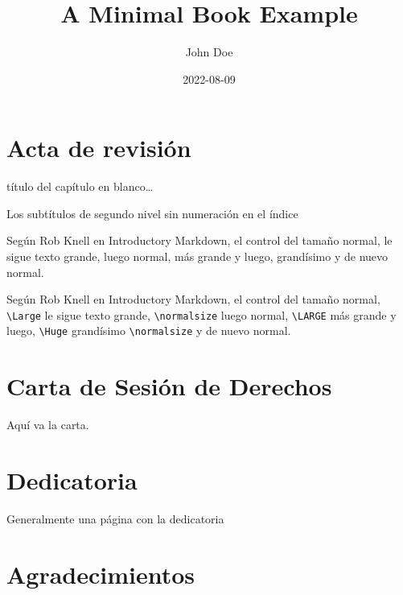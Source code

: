 \documentclass[
  11pt,
  twoside]{book}
\title{A Minimal Book Example}
\author{John Doe}
\date{2022-08-09}
\theoremstyle{definition}
\theoremstyle{definition}
\theoremstyle{definition}
\theoremstyle{definition}
\theoremstyle{remark}
\begin{document}
\maketitle

\fancyfoot[LE,RO]{\thepage}

\hypertarget{acta-de-revisiuxf3n}{%
\chapter*{Acta de revisión}\label{acta-de-revisiuxf3n}}

título del capítulo en blanco\ldots{}

Los subtítulos de segundo nivel sin numeración en el índice

Según Rob Knell en Introductory Markdown, el control del tamaño normal, \Large le sigue texto grande, \normalsize luego normal, \LARGE más grande y luego, \Huge grandísimo \normalsize y de nuevo normal.

Según Rob Knell en Introductory Markdown, el control del tamaño normal, \texttt{\textbackslash{}Large} le sigue texto grande, \texttt{\textbackslash{}normalsize} luego normal, \texttt{\textbackslash{}LARGE} más grande y luego, \texttt{\textbackslash{}Huge} grandísimo \texttt{\textbackslash{}normalsize} y de nuevo normal.

\hypertarget{carta-de-sesiuxf3n-de-derechos}{%
\chapter*{Carta de Sesión de Derechos}\label{carta-de-sesiuxf3n-de-derechos}}

Aquí va la carta.

\newpage

\hypertarget{dedicatoria}{%
\chapter*{Dedicatoria}\label{dedicatoria}}

Generalmente una página con la dedicatoria

\newpage

\hypertarget{agradecimientos}{%
\chapter*{Agradecimientos}\label{agradecimientos}}
\end{document}
